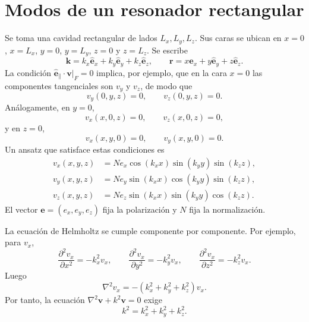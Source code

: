 \documentclass[11pt]{article}
\newcommand{\vb}[1]{\mathbf{#1}}
\newcommand{\uv}[1]{\hat{\vb e}_{#1}}
\begin{document}
\section{Modos de un resonador rectangular}

Se toma una cavidad rectangular de lados $L_x,L_y,L_z$. Sus caras se ubican
en $x=0$, $x=L_x$, $y=0$, $y=L_y$, $z=0$ y $z=L_z$. Se escribe
\begin{equation}
  \vb k=k_x\uv{x}+k_y\uv{y}+k_z\uv{z},
  \qquad
  \vb r=x\uv{x}+y\uv{y}+z\uv{z}.
\end{equation}
La condici\'on $\uv{\parallel}\cdot\vb v|_F=0$ implica, por ejemplo, que en
la cara $x=0$ las componentes tangenciales son $v_y$ y $v_z$, de modo que
\begin{equation}
  v_y(0,y,z)=0,
  \qquad
  v_z(0,y,z)=0.
\end{equation}
An\'alogamente, en $y=0$,
\begin{equation}
  v_x(x,0,z)=0,
  \qquad
  v_z(x,0,z)=0,
\end{equation}
y en $z=0$,
\begin{equation}
  v_x(x,y,0)=0,
  \qquad
  v_y(x,y,0)=0.
\end{equation}
Un ansatz que satisface estas condiciones es
\begin{align}
  v_x(x,y,z)
  &=
  N e_x\cos(k_xx)\sin(k_yy)\sin(k_zz),\\
  v_y(x,y,z)
  &=
  N e_y\sin(k_xx)\cos(k_yy)\sin(k_zz),\\
  v_z(x,y,z)
  &=
  N e_z\sin(k_xx)\sin(k_yy)\cos(k_zz).
\end{align}
El vector $\vb e=(e_x,e_y,e_z)$ fija la polarizaci\'on y $N$ fija la
normalizaci\'on.

La ecuaci\'on de Helmholtz se cumple componente por componente. Por ejemplo,
para $v_x$,
\begin{equation}
  \frac{\partial^2 v_x}{\partial x^2}
  =
  -k_x^2 v_x,
  \qquad
  \frac{\partial^2 v_x}{\partial y^2}
  =
  -k_y^2 v_x,
  \qquad
  \frac{\partial^2 v_x}{\partial z^2}
  =
  -k_z^2 v_x.
\end{equation}
Luego
\begin{equation}
  \nabla^2 v_x
  =
  -(k_x^2+k_y^2+k_z^2)v_x.
\end{equation}
Por tanto, la ecuaci\'on $\nabla^2\vb v+k^2\vb v=0$ exige
\begin{equation}
  k^2=k_x^2+k_y^2+k_z^2.
\end{equation}
\end{document}
